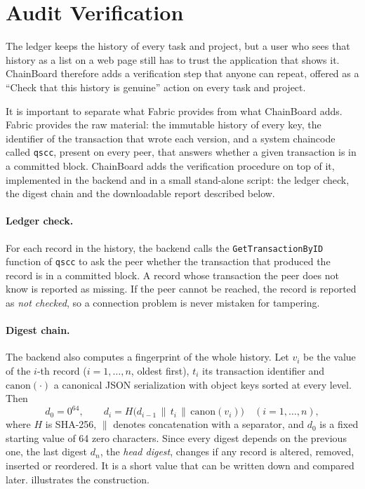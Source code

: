 \section{Audit Verification}
\label{sec:audit-verification}

The ledger keeps the history of every task and project, but a user who sees that history as a list on a web page still has to trust the application that shows it. ChainBoard therefore adds a verification step that anyone can repeat, offered as a ``Check that this history is genuine'' action on every task and project.

It is important to separate what Fabric provides from what ChainBoard adds. Fabric provides the raw material: the immutable history of every key, the identifier of the transaction that wrote each version, and a system chaincode called \texttt{qscc}, present on every peer, that answers whether a given transaction is in a committed block. ChainBoard adds the verification procedure on top of it, implemented in the backend and in a small stand-alone script: the ledger check, the digest chain and the downloadable report described below.

\paragraph*{Ledger check.} For each record in the history, the backend calls the \texttt{GetTransactionByID} function of \texttt{qscc} to ask the peer whether the transaction that produced the record is in a committed block. A record whose transaction the peer does not know is reported as missing. If the peer cannot be reached, the record is reported as \emph{not checked}, so a connection problem is never mistaken for tampering.

\paragraph*{Digest chain.} The backend also computes a fingerprint of the whole history. Let $v_i$ be the value of the $i$-th record ($i=1,\dots,n$, oldest first), $t_i$ its transaction identifier and $\mathrm{canon}(\cdot)$ a canonical JSON serialization with object keys sorted at every level. Then
\begin{equation}
    d_0 = 0^{64}, \qquad
    d_i = H\bigl(d_{i-1} \,\|\, t_i \,\|\, \mathrm{canon}(v_i)\bigr) \quad (i = 1,\dots,n),
\end{equation}
where $H$ is SHA-256, $\|$ denotes concatenation with a separator, and $d_0$ is a fixed starting value of 64 zero characters. Since every digest depends on the previous one, the last digest $d_n$, the \emph{head digest}, changes if any record is altered, removed, inserted or reordered. It is a short value that can be written down and compared later.  illustrates the construction.

